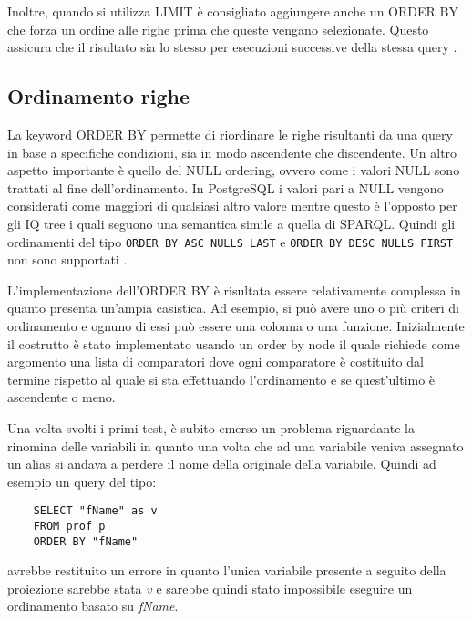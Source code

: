 Inoltre, quando si utilizza LIMIT è consigliato aggiungere anche un ORDER BY che forza un ordine alle righe prima che queste vengano selezionate. Questo assicura che il risultato sia 
lo stesso per esecuzioni successive della stessa query \cite{PGLimit}.

\subsection{Ordinamento righe}
La keyword ORDER BY permette di riordinare le righe risultanti da una query in base a specifiche condizioni, sia in modo ascendente che discendente. Un altro aspetto importante è quello del
NULL ordering, ovvero come i valori NULL sono trattati al fine dell'ordinamento. In PostgreSQL i valori pari a NULL vengono considerati come maggiori di qualsiasi altro valore mentre questo
è l'opposto per gli IQ tree i quali seguono una semantica simile a quella di SPARQL. Quindi gli ordinamenti del tipo \verb+ORDER BY ASC NULLS LAST+ e \verb+ORDER BY DESC NULLS FIRST+
non sono supportati \cite{PGOrderBY}.

L'implementazione dell'ORDER BY è risultata essere relativamente complessa in quanto presenta un'ampia casistica. Ad esempio, si può avere uno o più criteri di ordinamento e
ognuno di essi può essere una colonna o una funzione. Inizialmente il costrutto è stato implementato usando un order by node il quale richiede come argomento una lista di comparatori
dove ogni comparatore è costituito dal termine rispetto al quale si sta effettuando l'ordinamento e se quest'ultimo è ascendente o meno.

Una volta svolti i primi test, è subito emerso un problema riguardante la rinomina delle variabili in quanto una volta che ad una variabile veniva assegnato un alias si andava a perdere
il nome della originale della variabile. Quindi ad esempio un query del tipo:
\begin{verbatim}
    SELECT "fName" as v
    FROM prof p 
    ORDER BY "fName"
\end{verbatim}
avrebbe restituito un errore in quanto l'unica variabile presente a seguito della proiezione sarebbe stata \textit{v} e sarebbe quindi stato impossibile eseguire un ordinamento basato su
\textit{fName}.

